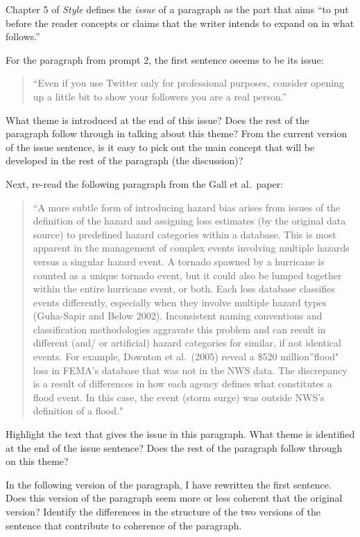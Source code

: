 \documentclass[]{tufte-book}
\begin{document}
Chapter 5 of \emph{Style} defines the \emph{issue} of a paragraph as the part that aims
``to put before the reader concepts or claims that the writer intends to expand
on in what follows.''

For the paragraph from prompt 2, the first sentence oseems to be its issue:

\begin{quote}
``Even if you use Twitter only for professional purposes, consider opening up a
little bit to show your followers you are a real person.''
\end{quote}

What theme is introduced at the end of this issue? Does the rest of the
paragraph follow through in talking about this theme? From the current version
of the issue sentence, is it easy to pick out the main concept that will be
developed in the rest of the paragraph (the discussion)?

Next, re-read the following paragraph from the Gall et al.~paper:

\begin{quote}
``A more subtle form of introducing hazard bias arises from issues of the
definition of the hazard and assigning loss estimates (by the original data
source) to predefined hazard categories within a database. This is most apparent
in the management of complex events involving multiple hazards versus a singular
hazard event. A tornado spawned by a hurricane is counted as a unique tornado
event, but it could also be lumped together within the entire hurricane event,
or both. Each loss database classifies events differently, especially when they
involve multiple hazard types (Guha-Sapir and Below 2002). Inconsistent naming
conventions and classification methodologies aggravate this problem and can
result in different (and/ or artificial) hazard categories for similar, if not
identical events. For example, Downton et al.~(2005) reveal a \$520 million''flood" loss in FEMA's database that was not in the NWS data. The discrepancy is
a result of differences in how each agency defines what constitutes a flood
event. In this case, the event (storm surge) was outside NWS's definition of a
flood."
\end{quote}

Highlight the text that gives the issue in this paragraph. What theme is identified
at the end of the issue sentence? Does the rest of the paragraph follow through
on this theme?

In the following version of the paragraph, I have rewritten the first sentence.
Does this version of the paragraph seem more or less coherent that the original
version? Identify the differences in the structure of the two versions of the
sentence that contribute to coherence of the paragraph.
\end{document}
